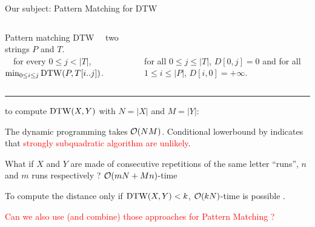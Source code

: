 \begin{frame}{Our subject: Pattern Matching for DTW}

    \begin{columns}
    \begin{mydefblock}{Pattern matching DTW}
        ~~two strings $P$ and $T$.\\ 
        ~~for every $0 \leq j < |T|$, 
        ~~~$\min_{0 \leq i \leq j} \mathrm{DTW}(P,T[i..j])$.
    \end{mydefblock}
    
    \vfill
    \\
    \smallskip
    \\
    for all $0\leq j\leq |T|$, $D[0,j]= 0$ and 
    for all $1 \leq i \leq |P|$, $D[i,0]=+\infty$.\\
    \vfill
    \end{columns}
    \pause
    
    \smallskip
    \noindent\textcolor{gray}{\rule{\textwidth}{0.1pt}}

    \smallskip
     to compute $\mathrm{DTW}(X,Y)$  with $N=|X|$ and $M=|Y|$:\pause
    
    \medskip
    The dynamic programming takes $\mathcal{O}(NM)$. \pause Conditional lowerbound by  indicates that \textcolor{red}{strongly subquadratic algorithm are unlikely}.\pause

    \medskip
    What if $X$ and $Y$ are made of consecutive repetitions of the same letter ``runs'', $n$ and $m$ runs respectively ? \pause
    $\mathcal{O}(mN+Mn)$-time \ntheme{[Froese et al.]} \pause

    To compute the distance only if $\mathrm{DTW}(X,Y) < k$, \pause $\mathcal{O}(kN)$-time is possible \ntheme{[Kuszmaul]}. \pause

    \medskip
    \textcolor{red}{Can we also use (and combine) those approaches for Pattern Matching ?}
\end{frame}


